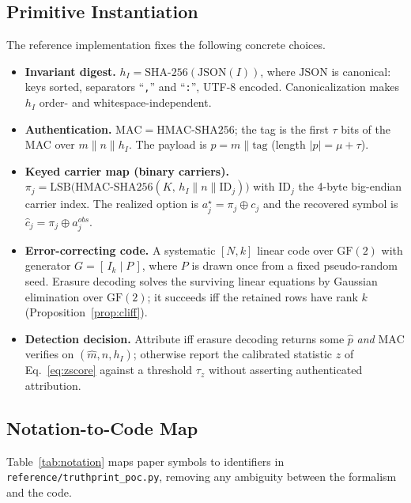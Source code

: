 \documentclass[journal]{IEEEtran}
\begin{document}
\subsection{Primitive Instantiation}
The reference implementation fixes the following concrete choices.
\begin{itemize}[leftmargin=*]
  \item \textbf{Invariant digest.} $h_I=\mathrm{SHA\text{-}256}(\mathrm{JSON}(I))$, where $\mathrm{JSON}$ is canonical: keys sorted, separators ``\texttt{,}'' and ``\texttt{:}'', UTF-8 encoded. Canonicalization makes $h_I$ order- and whitespace-independent.
  \item \textbf{Authentication.} $\mathrm{MAC}=\mathrm{HMAC\text{-}SHA256}$; the tag is the first $\tau$ bits of the MAC over $m\parallel n\parallel h_I$. The payload is $p=m\parallel\mathrm{tag}$ (length $|p|=\mu+\tau$).
  \item \textbf{Keyed carrier map (binary carriers).} $\pi_j=\mathrm{LSB}\big(\mathrm{HMAC\text{-}SHA256}(K,\,h_I\parallel n\parallel \mathrm{ID}_j)\big)$ with $\mathrm{ID}_j$ the 4-byte big-endian carrier index. The realized option is $a_j^\star=\pi_j\oplus c_j$ and the recovered symbol is $\hat c_j=\pi_j\oplus a_j^{obs}$.
  \item \textbf{Error-correcting code.} A systematic $[N,k]$ linear code over $\mathrm{GF}(2)$ with generator $G=[\,I_k\mid P\,]$, where $P$ is drawn once from a fixed pseudo-random seed. Erasure decoding solves the surviving linear equations by Gaussian elimination over $\mathrm{GF}(2)$; it succeeds iff the retained rows have rank $k$ (Proposition~\ref{prop:cliff}).
  \item \textbf{Detection decision.} Attribute iff erasure decoding returns some $\hat p$ \emph{and} $\mathrm{MAC}$ verifies on $(\hat m,n,h_I)$; otherwise report the calibrated statistic $z$ of Eq.~\eqref{eq:zscore} against a threshold $\tau_z$ without asserting authenticated attribution.
\end{itemize}

\subsection{Notation-to-Code Map}
Table~\ref{tab:notation} maps paper symbols to identifiers in \texttt{reference/truthprint\_poc.py}, removing any ambiguity between the formalism and the code.
\end{document}
